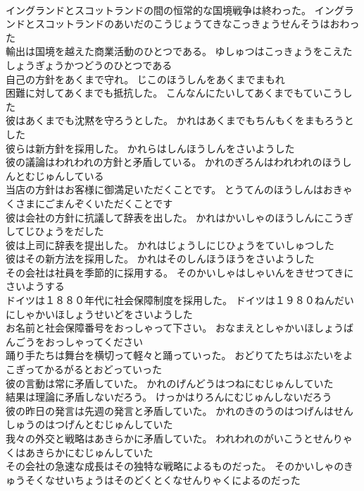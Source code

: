 \documentclass[8pt]{extreport}
\begin{document}
\begin{CJK}{UTF8}{min}
\\	イングランドとスコットランドの間の恒常的な国境戦争は終わった。	イングランドとスコットランドのあいだのこうじょうてきなこっきょうせんそうはおわった 
\\	輸出は国境を越えた商業活動のひとつである。	ゆしゅつはこっきょうをこえたしょうぎょうかつどうのひとつである 
\\	自己の方針をあくまで守れ。	じこのほうしんをあくまでまもれ 
\\	困難に対してあくまでも抵抗した。	こんなんにたいしてあくまでもていこうした 
\\	彼はあくまでも沈黙を守ろうとした。	かれはあくまでもちんもくをまもろうとした 
\\	彼らは新方針を採用した。	かれらはしんほうしんをさいようした 
\\	彼の議論はわれわれの方針と矛盾している。	かれのぎろんはわれわれのほうしんとむじゅんしている 
\\	当店の方針はお客様に御満足いただくことです。	とうてんのほうしんはおきゃくさまにごまんぞくいただくことです 
\\	彼は会社の方針に抗議して辞表を出した。	かれはかいしゃのほうしんにこうぎしてじひょうをだした 
\\	彼は上司に辞表を提出した。	かれはじょうしにじひょうをていしゅつした 
\\	彼はその新方法を採用した。	かれはそのしんほうほうをさいようした 
\\	その会社は社員を季節的に採用する。	そのかいしゃはしゃいんをきせつてきにさいようする 
\\	ドイツは１８８０年代に社会保障制度を採用した。	ドイツは１９８０ねんだいにしゃかいほしょうせいどをさいようした 
\\	お名前と社会保障番号をおっしゃって下さい。	おなまえとしゃかいほしょうばんごうをおっしゃってください 
\\	踊り手たちは舞台を横切って軽々と踊っていった。	おどりてたちはぶたいをよこぎってかるがるとおどっていった 
\\	彼の言動は常に矛盾していた。	かれのげんどうはつねにむじゅんしていた 
\\	結果は理論に矛盾しないだろう。	けっかはりろんにむじゅんしないだろう 
\\	彼の昨日の発言は先週の発言と矛盾していた。	かれのきのうのはつげんはせんしゅうのはつげんとむじゅんしていた 
\\	我々の外交と戦略はあきらかに矛盾していた。	われわれのがいこうとせんりゃくはあきらかにむじゅんしていた 
\\	その会社の急速な成長はその独特な戦略によるものだった。	そのかいしゃのきゅうそくなせいちょうはそのどくとくなせんりゃくによるのだった 

\end{CJK}
\end{document}
